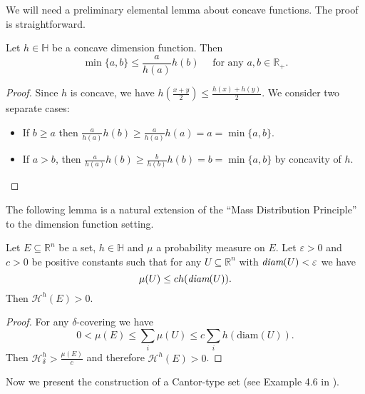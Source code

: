 \documentclass[11pt,a4paper]{amsart}
\begin{document}
We will need a preliminary elemental lemma about concave
functions. The proof is straightforward.
\begin{lemma}\label{lem:lemaconcava}
Let $h\in {\mathbb{H}}$ be a concave dimension function. Then
\[
 \min\{a,b\}\le \frac{a}{h(a)}h(b)\quad\text{ for any } a,b\in{\mathbb{R}}_+.
\]
\end{lemma}

\begin{proof}
Since $h$ is concave, we have $h\left(\frac{x+y}{2}\right) \leq \frac{h(x)+h(y)}{2}$. We consider two separate cases:
\begin{itemize}
    \item If $b\ge a$ then $\frac{a}{h(a)}h(b)\ge\frac{a}{h(a)}h(a)=a=\min\{a,b\}$.
    \item If $a> b$, then $\frac{a}{h(a)}h(b)\ge\frac{b}{h(b)}h(b)=b=\min\{a,b\}$ by concavity of $h$.    
\end{itemize}
\end{proof}
The following lemma is a natural extension of the ``Mass
Distribution Principle'' to the dimension function setting.
\begin{lemma}\label{lem:massh}
 Let $E{\subseteq}{\mathbb{R}}^n$ be a set, $h\in{\mathbb{H}}$ and $\mu$ a probability measure on $E$. Let ${\varepsilon}>0$ and $c>0$ be positive constants such that for any $U{\subseteq}{\mathbb{R}}^n$ with $\emph{\text{diam}}(U)<{\varepsilon}$ we have
\begin{equation*}
 \mu(U)\le c h(\emph{\text{diam}}(U)).
\end{equation*}
Then ${\mathcal{H}^{{h}}}(E)>0$.
\end{lemma}
\begin{proof}
For any $\delta$-covering we have
\begin{equation*}
 0<\mu(E)\le \sum_i\mu(U)\le c\sum_i h({\text{diam}}(U)).
\end{equation*}
Then ${\mathcal{H}_{\delta}^{{h}}}>\frac{\mu(E)}{c}$ and therefore ${\mathcal{H}^{{h}}}(E)>0$.
\end{proof}
Now we present the construction of a Cantor-type set (see Example 4.6 in \cite{fal03}).
\end{document}
